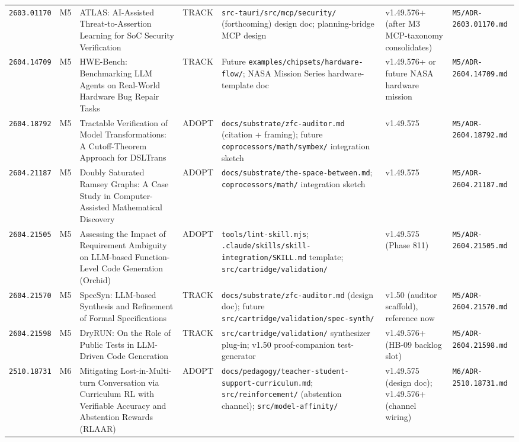 \documentclass[11pt,letterpaper]{article}
\newcommand{\arxivid}[1]{\texttt{\textcolor{accent}{#1}}}
\begin{document}
\begin{footnotesize}
\begin{longtable}{@{}L{0.10\textwidth} L{0.025\textwidth} L{0.22\textwidth} L{0.06\textwidth} L{0.20\textwidth} L{0.13\textwidth} L{0.13\textwidth}@{}}
\arxivid{2603.01170} & M5 & ATLAS: AI-Assisted Threat-to-Assertion Learning for SoC Security Verification & TRACK & \texttt{src-tauri/src/mcp/security/} (forthcoming) design doc; planning-bridge MCP design & v1.49.576+ (after M3 MCP-taxonomy consolidates) & \texttt{\small M5/ADR-2603.01170.md} \\
\arxivid{2604.14709} & M5 & HWE-Bench: Benchmarking LLM Agents on Real-World Hardware Bug Repair Tasks & TRACK & Future \texttt{examples/chipsets/hardware-flow/}; NASA Mission Series hardware-template doc & v1.49.576+ or future NASA hardware mission & \texttt{\small M5/ADR-2604.14709.md} \\
\arxivid{2604.18792} & M5 & Tractable Verification of Model Transformations: A Cutoff-Theorem Approach for DSLTrans & ADOPT & \texttt{docs/substrate/zfc-auditor.md} (citation + framing); future \texttt{coprocessors/math/symbex/} integration sketch & v1.49.575 & \texttt{\small M5/ADR-2604.18792.md} \\
\arxivid{2604.21187} & M5 & Doubly Saturated Ramsey Graphs: A Case Study in Computer-Assisted Mathematical Discovery & ADOPT & \texttt{docs/substrate/the-space-between.md}; \texttt{coprocessors/math/} integration sketch & v1.49.575 & \texttt{\small M5/ADR-2604.21187.md} \\
\arxivid{2604.21505} & M5 & Assessing the Impact of Requirement Ambiguity on LLM-based Function-Level Code Generation (Orchid) & ADOPT & \texttt{tools/lint-skill.mjs}; \texttt{.claude/skills/skill-integration/SKILL.md} template; \texttt{src/cartridge/validation/} & v1.49.575 (Phase 811) & \texttt{\small M5/ADR-2604.21505.md} \\
\arxivid{2604.21570} & M5 & SpecSyn: LLM-based Synthesis and Refinement of Formal Specifications & TRACK & \texttt{docs/substrate/zfc-auditor.md} (design doc); future \texttt{src/cartridge/validation/spec-synth/} & v1.50 (auditor scaffold), reference now & \texttt{\small M5/ADR-2604.21570.md} \\
\arxivid{2604.21598} & M5 & DryRUN: On the Role of Public Tests in LLM-Driven Code Generation & TRACK & \texttt{src/cartridge/validation/} synthesizer plug-in; v1.50 proof-companion test-generator & v1.49.576+ (HB-09 backlog slot) & \texttt{\small M5/ADR-2604.21598.md} \\
\arxivid{2510.18731} & M6 & Mitigating Lost-in-Multi-turn Conversation via Curriculum RL with Verifiable Accuracy and Abstention Rewards (RLAAR) & ADOPT & \texttt{docs/pedagogy/teacher-student-support-curriculum.md}; \texttt{src/reinforcement/} (abstention channel); \texttt{src/model-affinity/} & v1.49.575 (design doc); v1.49.576+ (channel wiring) & \texttt{\small M6/ADR-2510.18731.md} \\

\end{longtable}
\end{footnotesize}
\end{document}
